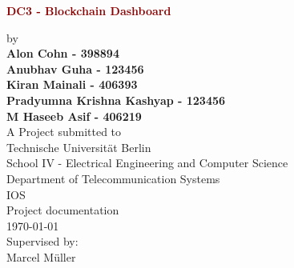 \begin{titlepage}
	\strut
	\hfill
	\begin{center}
	\vspace{1cm}
		\Huge
		\begin{spacing}{.9}
			\textcolor{DarkRed}{\textbf{DC3 - Blockchain Dashboard}}\\
		\end{spacing}
		\vspace{0.8cm}
		\large
		by\\
		\vspace{0.8cm}
		\textbf{Alon Cohn - 398894}\\
		\textbf{Anubhav Guha - 123456}\\
		\textbf{Kiran Mainali - 406393}\\
		\textbf{Pradyumna Krishna Kashyap - 123456}\\
		\textbf{M Haseeb Asif - 406219}\\
		\vspace{0.8cm}
		\vspace{2cm}
	 	A Project submitted to\\
		\vspace{0.5cm}
		Technische Universität Berlin\\
		School IV - Electrical Engineering and Computer Science\\
		Department of Telecommunication Systems\\
		IOS\\
		\vspace{0.5cm}
		Project documentation\\
		\vspace{2.2cm}
		\today\\
		\vspace{2.0cm}
		\large
		Supervised by:\\
    	Marcel Müller\\
		\vspace{1cm}
		\end{center}
\end{titlepage}

\shipout\null
\shipout\null